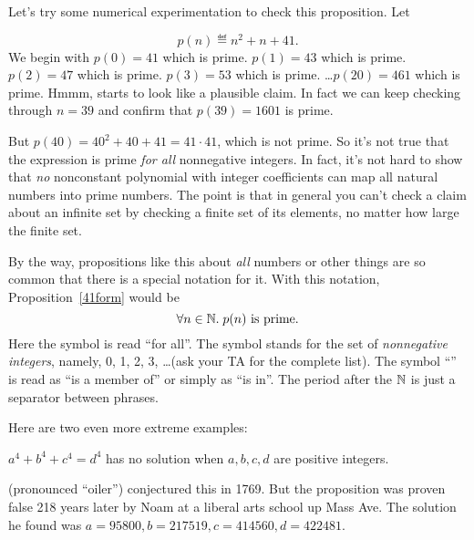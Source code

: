 Let's try some numerical experimentation to check this proposition.
Let
\begin{equation}\label{pn41}
p(n) \eqdef  n^2 + n + 41.
\end{equation}
We begin with $p(0) = 41$ which is prime.  $p(1) = 43$ which is prime.  $p(2) = 47$
which is prime.  $p(3)=53$ which is prime. \dots $p(20) = 461$ which is
prime.  Hmmm, starts to look like a plausible claim.  In fact we can keep
checking through $n=39$ and confirm that $p(39)=1601$ is prime.

But $p(40) = 40^2 + 40 + 41 = 41 \cdot 41$, which is not prime.  So it's
not true that the expression is prime {\em for all} nonnegative integers.
In fact, it's not hard to show that \emph{no} nonconstant polynomial with
integer coefficients can map all natural numbers into prime numbers.  The
point is that in general you can't check a claim about an infinite set by
checking a finite set of its elements, no matter how large the finite set.

By the way, propositions like this about \emph{all} numbers or other
things are so common that there is a special notation for it.  With this notation,
Proposition~\ref{41form} would be
\begin{equation}\label{pn}
\forall n \in \mathbb{N}.\; p(n) \text{ is prime}.
\end{equation}
Here the symbol \term{$\forall$} is read ``for all''.  The symbol \term{$\naturals$}
stands for the set of {\em nonnegative integers}, namely, 0, 1, 2, 3,
\dots (ask your TA for the complete list).  The symbol ``\term{$\in$}'' is read
as ``is a member of'' or simply as ``is in''.  The period after the
$\naturals$ is just a separator between phrases.

\iffalse
\begin{notesproblem}
Show that no nonconstant polynomial can map all nonnegative integers into
prime numbers.  (This can be proved using elementary algebra, but it's a
little tricky.  It will be easier to show after we study modular
arithmetic later in the term.)
\end{notesproblem}
\fi


Here are two even more extreme examples:
\begin{proposition}\label{a4}
$a^4 + b^4 + c^4 = d^4$ has no solution when $a, b, c, d$ are positive
integers.
\end{proposition}
 (pronounced ``oiler'') conjectured this in 1769.  But the proposition
was proven false 218 years later by Noam  at a liberal arts school
up Mass Ave.  The solution he found was $a = 95800, b = 217519, c = 414560, d
= 422481$.

